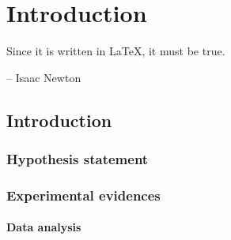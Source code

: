 \chapter{Introduction} \label{chap:chap-3}


\epigraph{Since it is written in \LaTeX, it must be true.}{-- Isaac Newton}





\section{Introduction}

\subsection{Hypothesis statement}


\subsection{Experimental evidences}


\subsubsection{Data analysis}
